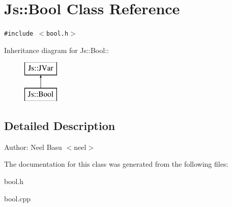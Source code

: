 \section{Js::Bool Class Reference}
\label{classJs_1_1Bool}
{\tt \#include $<$bool.h$>$}

Inheritance diagram for Js::Bool::\begin{figure}[H]
\begin{center}
\leavevmode
\includegraphics[height=2cm]{classJs_1_1Bool}
\end{center}
\end{figure}


\subsection{Detailed Description}
\begin{Desc}
\item[Author:]Neel Basu $<$neel$>$ \end{Desc}


The documentation for this class was generated from the following files:\begin{CompactItemize}
\item 
bool.h\item 
bool.cpp\end{CompactItemize}

